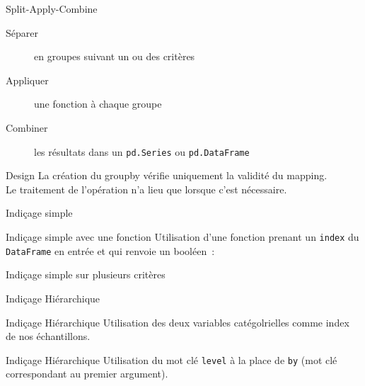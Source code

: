 \begin{frame}{Split-Apply-Combine}
  \begin{description}
    \item[Séparer]   en groupes suivant un ou des critères
    \item[Appliquer] une fonction à chaque groupe
    \item[Combiner]  les résultats dans un \texttt{pd.Series} ou \texttt{pd.DataFrame}
  \end{description}
\end{frame}

\begin{frame}{Design}
  La création du groupby vérifie uniquement la validité du mapping. \\
  Le traitement de l'opération n'a lieu que lorsque c'est nécessaire. \\
\end{frame}

\begin{frame}{Indiçage simple}
\end{frame}

\begin{frame}{Indiçage simple avec une fonction}
  Utilisation d'une fonction prenant un \texttt{index} du \texttt{DataFrame} en entrée et qui renvoie un booléen~:
\end{frame}

\begin{frame}{Indiçage simple sur plusieurs critères}
\end{frame}

\begin{frame}{Indiçage Hiérarchique}
\end{frame}

\begin{frame}{Indiçage Hiérarchique}
  Utilisation des deux variables catégolrielles comme index de nos échantillons.\\
\end{frame}

\begin{frame}{Indiçage Hiérarchique}
  Utilisation du mot clé \texttt{level} à la place de \texttt{by} (mot clé correspondant au premier argument).\\
\end{frame}

